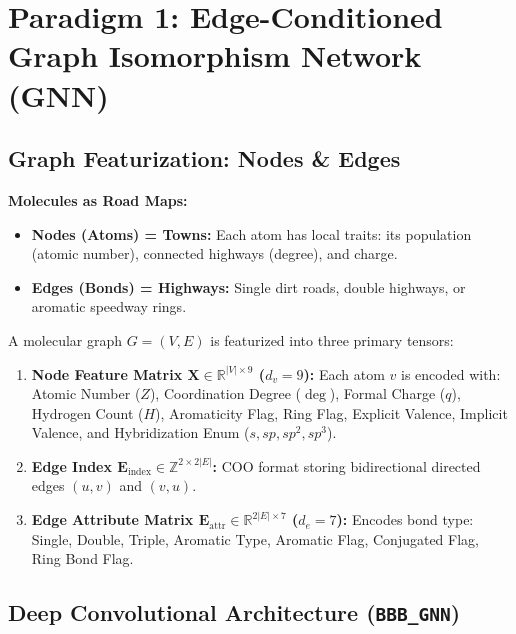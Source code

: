 \documentclass[11pt,a4paper]{article}
\begin{document}
\newpage
\section{Paradigm 1: Edge-Conditioned Graph Isomorphism Network (GNN)}

\subsection{Graph Featurization: Nodes \& Edges}

\begin{laymanbox}
\textbf{Molecules as Road Maps:}
\begin{itemize}[leftmargin=*]
    \item \textbf{Nodes (Atoms) = Towns:} Each atom has local traits: its population (atomic number), connected highways (degree), and charge.
    \item \textbf{Edges (Bonds) = Highways:} Single dirt roads, double highways, or aromatic speedway rings.
\end{itemize}
\end{laymanbox}

\begin{mathspecbox}
A molecular graph $G = (V, E)$ is featurized into three primary tensors:
\begin{enumerate}[leftmargin=*]
    \item \textbf{Node Feature Matrix $\mathbf{X} \in \mathbb{R}^{|V| \times 9}$ ($d_v = 9$):}
    Each atom $v$ is encoded with: Atomic Number ($Z$), Coordination Degree ($\deg$), Formal Charge ($q$), Hydrogen Count ($H$), Aromaticity Flag, Ring Flag, Explicit Valence, Implicit Valence, and Hybridization Enum ($s, sp, sp^2, sp^3$).
    \item \textbf{Edge Index $\mathbf{E}_{\text{index}} \in \mathbb{Z}^{2 \times 2|E|}$:}
    COO format storing bidirectional directed edges $(u, v)$ and $(v, u)$.
    \item \textbf{Edge Attribute Matrix $\mathbf{E}_{\text{attr}} \in \mathbb{R}^{2|E| \times 7}$ ($d_e = 7$):}
    Encodes bond type: Single, Double, Triple, Aromatic Type, Aromatic Flag, Conjugated Flag, Ring Bond Flag.
\end{enumerate}
\end{mathspecbox}

\subsection{Deep Convolutional Architecture (\texttt{BBB\_GNN})}
\end{document}
